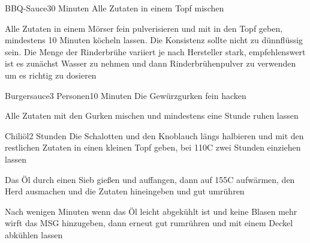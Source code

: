 

\begin{recipe}{BBQ-Sauce}{}{30 Minuten}
Alle Zutaten in einem Topf mischen

Alle Zutaten in einem Mörser fein pulverisieren und mit in den Topf geben, mindestens 10 Minuten köcheln lassen. Die Konsistenz sollte nicht zu dünnflüssig sein. Die Menge der Rinderbrühe variiert je nach Hersteller stark, empfehlenswert ist es zunächst Wasser zu nehmen und dann Rinderbrühenpulver zu verwenden um es richtig zu dosieren
\end{recipe}


\begin{recipe}{Burgersauce}{3 Personen}{10 Minuten}
Die Gewürzgurken fein hacken

Alle Zutaten mit den Gurken mischen und mindestens eine Stunde ruhen lassen
\end{recipe}


\begin{recipe}{Chiliöl}{}{2 Stunden}
Die Schalotten und den Knoblauch längs halbieren und mit den restlichen Zutaten in einen kleinen Topf geben, bei 110\0C zwei Stunden einziehen lassen

Das Öl durch einen Sieb gießen und auffangen, dann auf 155\0C aufwärmen, den Herd ausmachen und die Zutaten hineingeben und gut umrühren

Nach wenigen Minuten wenn das Öl leicht abgekühlt ist und keine Blasen mehr wirft das MSG hinzugeben, dann erneut gut rumrühren und mit einem Deckel abkühlen lassen
\end{recipe}


